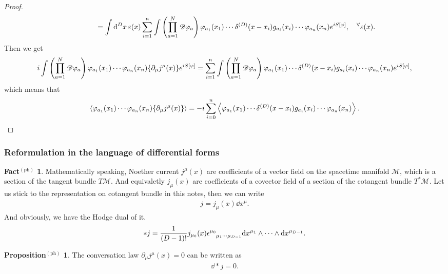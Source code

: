 \documentclass{article}
\theoremstyle{definition}
\newtheorem{propositionph}{Proposition$^\mathrm{(ph)}$}[section]
\newtheorem{factph}{Fact$^\mathrm{(ph)}$}[section]
\numberwithin{equation}{section}
\newcommand{\fidim}{\int \qty(\prod_{a = 1}^{N} \mathscr{D}\varphi_a) \, }
\newcommand{\intst}{\int \dd^Dx \,}
\newcommand{\del}{\partial_\mu}
\begin{document}
\begin{proof}
\begin{align}
    & \quad\quad\quad\quad = \intst \varepsilon(x) \sum_{i = 1}^{n} \fidim \varphi_{a_1}(x_1) \cdots \delta^{(D)}(x - x_i) g_{a_i}(x_i) \cdots \varphi_{a_n}(x_n)e^{iS[\varphi]},
      \quad ^\forall \varepsilon(x).
  \end{align}
  Then we get
  \begin{align}
    i\fidim \varphi_{a_1}(x_1) \cdots \varphi_{a_n}(x_n) \qty{\del j^\mu(x)}e^{iS[\varphi]}
    = \sum_{i = 1}^{n} \fidim \varphi_{a_1}(x_1) \cdots \delta^{(D)}(x - x_i) g_{a_i}(x_i) \cdots \varphi_{a_n}(x_n)e^{iS[\varphi]},
  \end{align}
  which means that
  \begin{align}
    \ev{\varphi_{a_1}(x_1) \cdots \varphi_{a_n}(x_n) \qty{\del j^\mu(x)}} = -i\sum_{i = 0}^{n}\ev{\varphi_{a_1}(x_1) \cdots \delta^{(D)}(x - x_i) g_{a_i}(x_i) \cdots \varphi_{a_n}(x_n)}.
    \label{corr-conv-law}
  \end{align}
\end{proof}

\subsubsection{Reformulation in the language of differential forms}
\begin{factph}
  Mathematically speaking, Noether current $j^\mu(x)$ are coefficients of a vector field on the spacetime manifold $\mathscr{M}$, which is a section of the tangent bundle $T\mathscr{M}$. And equivaletly $j_\mu(x)$ are coefficients of a covector field of a section of the cotangent bundle $T^*\mathscr{M}$. Let us stick to the representation on cotangent bundle in this notes, then we can write
  \begin{align}
    j = j_\mu(x) \dd x^\mu.
  \end{align}
  And obviously, we have the Hodge dual of it.
  \begin{align}
    *j = \frac{1}{(D - 1)!}j_{\mu_0}(x) \tensor{\epsilon}{^{\mu_0}_{\mu_1\cdots\mu_{D-1}}} \dd x^{\mu_1} \wedge \cdots \wedge \dd x^{\mu_{D-1}}.
  \end{align}
\end{factph}

\begin{propositionph}
  The conversation law $\del j^\mu(x) = 0$ can be written as
  \begin{align}
    \dd *j = 0.
  \end{align}
\end{propositionph}
\end{document}
